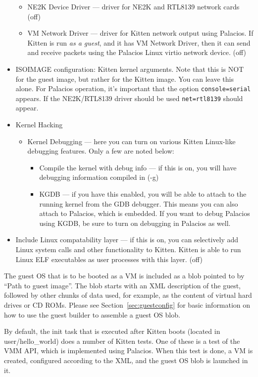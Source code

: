 \documentclass[11pt]{article}
\begin{document}
\begin{itemize}
\begin{itemize}
\item NE2K Device Driver --- driver for NE2K and RTL8139 network cards
(off)
\item VM Network Driver --- driver for Kitten network output using
Palacios.  If Kitten is run {\em as a guest}, and it has VM Network
Driver, then it can send and receive packets using the Palacios Linux
virtio network device.  (off)
\end{itemize}
\item ISOIMAGE configuration:  Kitten kernel arguments.   Note that
this is NOT for the guest image, but rather for the Kitten image.  You
can leave this alone.  For Palacios operation, it's important that the
option \verb.console=serial. appears.  If the NE2K/RTL8139 driver
should be used \verb.net=rtl8139. should appear. 
\item Kernel Hacking
\begin{itemize}
\item Kernel Debugging --- here you can turn on various Kitten
Linux-like debugging features.   Only a few are noted below:
\begin{itemize}
\item Compile the kernel with debug info --- if this is on, you will
have debugging information compiled in (-g)
\item KGDB --- if you have this enabled, you will be able to attach to
the running kernel from the GDB debugger.  This means you can also
attach to Palacios, which is embedded.   If you want to debug Palacios
using KGDB, be sure to turn on debugging in Palacios as well.
\end{itemize}
\end{itemize}
\item Include Linux compatability layer --- if this is on, you can 
selectively add Linux system calls and other functionality to Kitten.
Kitten is able to run Linux ELF executables as user processes with
this layer. (off)  
\end{itemize}

The guest OS that is to be booted as a VM is included as a blob
pointed to by ``Path to guest image''.   The blob starts with an XML
description of the guest, followed by other chunks of data used, for
example, as the content of virtual hard drives or CD ROMs.  Please see
Section~\ref{sec:guestconfig} for basic information on how to use the
guest builder to assemble a guest OS blob. 

By default, the init task that is executed after Kitten boots (located
in user/hello\_world) does a number of Kitten tests.  One of these is
a test of the VMM API, which is implemented using Palacios.  When this
test is done, a VM is created, configured according to the XML, and
the guest OS blob is launched in it.
\end{document}
